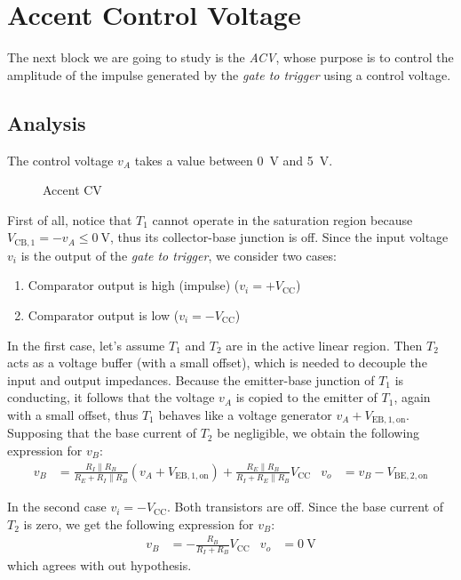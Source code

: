 \documentclass{article}
\newcommand{\var}[2]{#1_\mathrm{#2}}
\theoremstyle{definition}
\begin{document}
\section{Accent Control Voltage}
The next block we are going to study is the \textit{ACV}, whose purpose is to control the amplitude of the impulse generated by the \textit{gate to trigger} using a control voltage.

\subsection{Analysis}
The control voltage \(v_A\) takes a value between \qty{0}{\volt} and \qty{5}{\volt}.

\begin{figure}[ht]
    \centering
    
    \caption{Accent CV}
    \label{fig:accent-cv}
\end{figure}

First of all, notice that \(T_1\) cannot operate in the saturation region because \(\var{V}{CB,1} = -v_A \le \qty{0}{\volt}\), thus its collector-base junction is off.
Since the input voltage \(v_i\) is the output of the \textit{gate to trigger}, we consider two cases:

\begin{enumerate}
    \item Comparator output is high (impulse) (\(v_i = +\var{V}{CC}\))
    \item Comparator output is low (\(v_i = -\var{V}{CC}\))
\end{enumerate}

In the first case, let's assume \(T_1\) and \(T_2\) are in the active linear region.
Then \(T_2\) acts as a voltage buffer (with a small offset), which is needed to decouple the input and output impedances.
Because the emitter-base junction of \(T_1\) is conducting, it follows that the voltage \(v_A\) is copied to the emitter of \(T_1\), again with a small offset, thus \(T_1\) behaves like a voltage generator \(v_A + \var{V}{EB,1,on}\).
Supposing that the base current of \(T_2\) be negligible, we obtain the following expression for \(v_B\):
\begin{align}
    v_B &= \frac{R_I \parallel R_B}{R_E + R_I \parallel R_B} \left(v_A + \var{V}{EB,1,on} \right)
    + \frac{R_E \parallel R_B}{R_I + R_E \parallel R_B} \var{V}{CC}
    &
    v_o &= v_B - \var{V}{BE,2,on}
\end{align}

In the second case \(v_i = -\var{V}{CC}\).
Both transistors are off. Since the base current of \(T_2\) is zero, we get the following expression for \(v_B\):
\begin{align*}
    v_B &= -\frac{R_B}{R_I + R_B} \var{V}{CC}
    &
    v_o &= \qty{0}{\volt}
\end{align*}
which agrees with out hypothesis.
\end{document}
